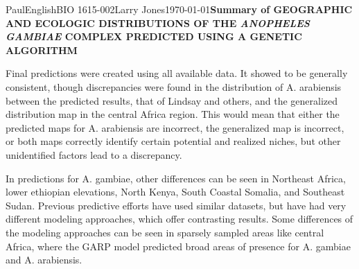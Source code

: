 \documentclass[10pt,twocolumn]{article}
\begin{document}
\begin{mla}{Paul}{English}{BIO 1615-002}{Larry Jones}{\today}{\textbf{Summary of GEOGRAPHIC AND ECOLOGIC DISTRIBUTIONS OF THE \textit{ANOPHELES GAMBIAE} COMPLEX PREDICTED USING A GENETIC ALGORITHM}}

Final predictions were created using all available data. It showed to be generally consistent, though discrepancies were found in the distribution of A. arabiensis between the predicted results, that of Lindsay and others, and the generalized distribution map in the central Africa region. This would mean that either the predicted maps for A. arabiensis are incorrect, the generalized map is incorrect, or both maps correctly identify certain potential and realized niches, but other unidentified factors lead to a discrepancy.

In predictions for A. gambiae, other differences can be seen in Northeast Africa, lower ethiopian elevations, North Kenya, South Coastal Somalia, and Southeast Sudan. Previous predictive efforts have used similar datasets, but have had very different modeling approaches, which offer contrasting results. Some differences of the modeling approaches can be seen in sparsely sampled areas like central Africa, where the GARP model predicted broad areas of presence for A. gambiae and A. arabiensis. 


\end{mla}
\end{document}
